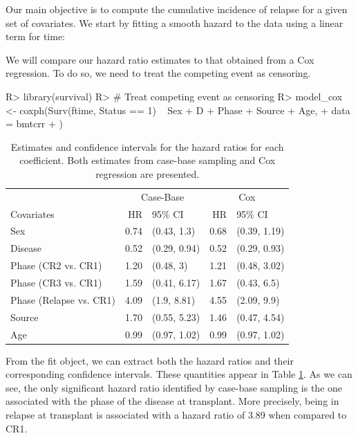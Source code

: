 \documentclass[
]{jss}
\begin{document}
Our main objective is to compute the cumulative incidence of relapse for
a given set of covariates. We start by fitting a smooth hazard to the
data using a linear term for time:

We will compare our hazard ratio estimates to that obtained from a Cox
regression. To do so, we need to treat the competing event as censoring.

\begin{CodeChunk}

\begin{CodeInput}
R> library(survival)
R> # Treat competing event as censoring
R> model_cox <- coxph(Surv(ftime, Status == 1) ~ Sex + D + Phase + Source + Age,
+   data = bmtcrr
+ )
\end{CodeInput}
\end{CodeChunk}

\begin{CodeChunk}
\begin{table}

\caption{\label{tab:bmtcrr-cis}Estimates and confidence intervals for the hazard ratios for each coefficient. Both estimates from case-base sampling and Cox regression are presented.}
\centering
\begin{tabular}[t]{lrlrl}
\toprule
\multicolumn{1}{c}{ } & \multicolumn{2}{c}{Case-Base} & \multicolumn{2}{c}{Cox} \\
\cmidrule(l{3pt}r{3pt}){2-3} \cmidrule(l{3pt}r{3pt}){4-5}
Covariates & HR & 95\% CI & HR & 95\% CI\\
\midrule
Sex & 0.74 & (0.43, 1.3) & 0.68 & (0.39, 1.19)\\
Disease & 0.52 & (0.29, 0.94) & 0.52 & (0.29, 0.93)\\
Phase (CR2 vs. CR1) & 1.20 & (0.48, 3) & 1.21 & (0.48, 3.02)\\
Phase (CR3 vs. CR1) & 1.59 & (0.41, 6.17) & 1.67 & (0.43, 6.5)\\
Phase (Relapse vs. CR1) & 4.09 & (1.9, 8.81) & 4.55 & (2.09, 9.9)\\
\addlinespace
Source & 1.70 & (0.55, 5.23) & 1.46 & (0.47, 4.54)\\
Age & 0.99 & (0.97, 1.02) & 0.99 & (0.97, 1.02)\\
\bottomrule
\end{tabular}
\end{table}

\end{CodeChunk}

From the fit object, we can extract both the hazard ratios and their
corresponding confidence intervals. These quantities appear in Table
\ref{tab:bmtcrr-cis}. As we can see, the only significant hazard ratio
identified by case-base sampling is the one associated with the phase of
the disease at transplant. More precisely, being in relapse at
transplant is associated with a hazard ratio of 3.89 when compared to
CR1.
\end{document}
